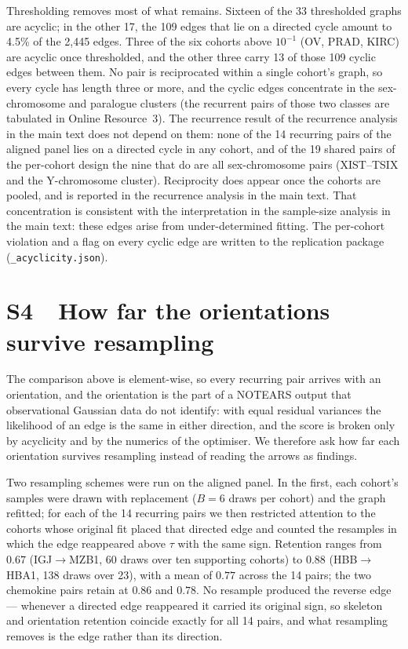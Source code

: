 \documentclass[11pt]{article}
\begin{document}
Thresholding removes most of what remains. Sixteen of the 33 thresholded graphs are acyclic; in the other 17, the 109 edges that lie on a directed cycle amount to 4.5\% of the 2,445 edges. Three of the six cohorts above $10^{-1}$ (OV, PRAD, KIRC) are acyclic once thresholded, and the other three carry 13 of those 109 cyclic edges between them. No pair is reciprocated within a single cohort's graph, so every cycle has length three
or more, and the cyclic edges concentrate in the sex-chromosome and paralogue clusters (the
recurrent pairs of those two classes are tabulated in Online Resource~3). The recurrence
result of the recurrence analysis in the main text does not depend on them: none of the 14 recurring pairs of
the aligned panel lies on a directed cycle in any cohort, and of the 19 shared pairs of the
per-cohort design the nine that do are all sex-chromosome pairs (XIST--TSIX and the
Y-chromosome cluster).
Reciprocity does appear once the cohorts are pooled, and is reported in
the recurrence analysis in the main text. That concentration is consistent with the interpretation in the sample-size analysis in the main text: these edges arise from under-determined fitting. The per-cohort violation and a flag on every cyclic edge are written to the replication package (\texttt{\_acyclicity.json}).

\section*{S4\ \ How far the orientations survive resampling}

The comparison above is element-wise, so every recurring pair arrives with an orientation, and the orientation is the part of a NOTEARS output that observational Gaussian data do not identify: with equal residual variances the likelihood of an edge is the same in either direction, and the score is broken only by acyclicity and by the numerics of the optimiser. We therefore ask how far each orientation survives resampling instead of reading the arrows as findings.

Two resampling schemes were run on the aligned panel. In the first, each cohort's samples were drawn with replacement ($B = 6$ draws per cohort) and the graph refitted; for each of the 14 recurring pairs we then restricted attention to the cohorts whose original fit placed that directed edge and counted the resamples in which the edge reappeared above $\tau$ with the same sign. Retention ranges from $0.67$ (IGJ$\rightarrow$MZB1, 60 draws over ten supporting cohorts) to $0.88$ (HBB$\rightarrow$HBA1, 138 draws over 23), with a mean of $0.77$ across the 14 pairs; the two chemokine pairs retain at $0.86$ and $0.78$. No resample produced the reverse edge --- whenever a directed edge reappeared it carried its original sign, so skeleton and orientation retention coincide exactly for all 14 pairs, and what resampling removes is the edge rather than its direction.
\end{document}
